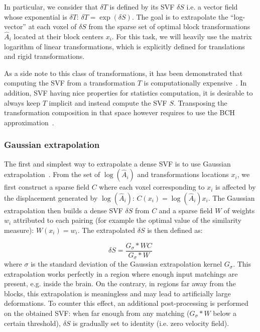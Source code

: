 In particular, we consider that $\delta T$ is defined by its \ac{SVF} $\delta S$ i.e. a vector field whose exponential is $\delta T$: $\delta T = \exp(\delta S)$. The goal is to extrapolate the ``log-vector'' at each voxel of $\delta S$ from the sparse set of optimal block transformations $\hat{A}_i$ located at their block centers $x_i$. For this task, we will heavily use the matrix logarithm of linear transformations, which is explicitly defined for translations and rigid transformations.

As a side note to this class of transformations, it has been demonstrated that computing the \ac{SVF} from a transformation $T$ is computationally expensive~\cite{arsigny:inria-00615594}. In addition, \ac{SVF} having nice properties for statistics computation, it is desirable to always keep $T$ implicit and instead compute the \ac{SVF} $S$. Transposing the transformation composition in that space however requires to use the \ac{BCH} approximation~\cite{Bossa_Miccai_2007,Vercauteren_Miccai_2008}.

\subsubsection{Gaussian extrapolation} %
\label{ssub:gaussian_extrapolation}

The first and simplest way to extrapolate a dense \ac{SVF} is to use Gaussian extrapolation~\cite{commowick:tel-00133432,garcia:inria-00616148}. From the set of $\log(\hat{A}_i)$ and transformations locations $x_i$, we first construct a sparse field $C$ where each voxel corresponding to $x_i$ is affected by the displacement generated by $\log(\hat{A}_i)$: $C(x_i) = \log(\hat{A}_i) x_i$. The Gaussian extrapolation then builds a dense \ac{SVF} $\delta S$ from $C$ and a sparse field $W$ of weights $w_i$ attributed to each pairing (for example the optimal value of the similarity measure): $W(x_i) = w_i$. The extrapolated $\delta S$ is then defined as:

\begin{equation}
	\delta S = \frac{G_\sigma * W C}{G_\sigma * W}
\end{equation}
where $\sigma$ is the standard deviation of the Gaussian extrapolation kernel $G_\sigma$. This extrapolation works perfectly in a region where enough input matchings are present, e.g. inside the brain. On the contrary, in regions far away from the blocks, this extrapolation is meaningless and may lead to artificially large deformations. To counter this effect, an additional post-processing is performed on the obtained \ac{SVF}: when far enough from any matching ($G_\sigma * W$ below a certain threshold), $\delta S$ is gradually set to identity (i.e. zero velocity field).

